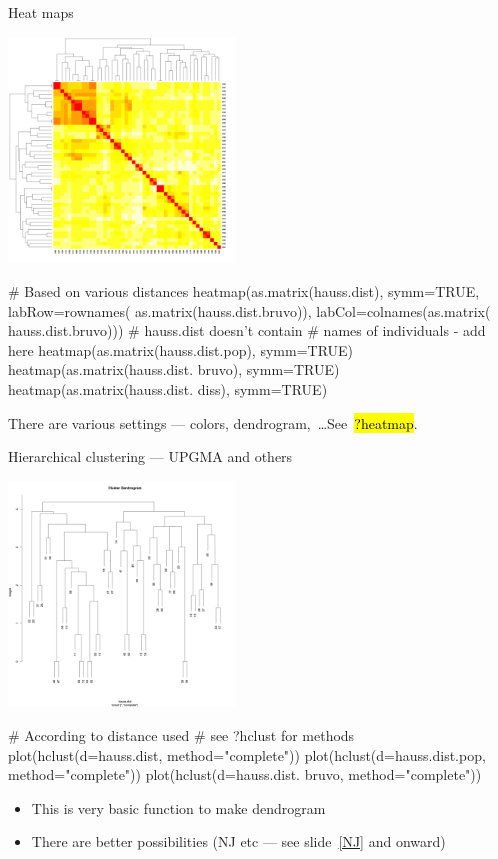 \documentclass[compress, ucs, xelatex, 11pt, xcolor=svgnames,
	hyperref={
		bookmarks=true,
		unicode=true,
		colorlinks=true,
		pdftitle={Molecular data in R},
		plainpages=false,
		pdfauthor={Vojtech Zeisek},
		pdfsubject={Course about phylogeny and evolution in R},
		pdfcreator={XeLaTeX},
		pdfkeywords={R, evolution, phylogeny, molecular data},
		linkcolor=Tomato,
		anchorcolor=SaddleBrown,
		citecolor=Goldenrod,
		filecolor=DarkMagenta,
		menucolor=Sienna,
		urlcolor=DarkTurquoise,
		pdftex},
	url={hyphens, lowtilde} %
	]{beamer}
\renewcommand{\texttt}[1]{\hl{\ttfamily #1}}
\begin{document}
\begin{frame}[fragile]{Heat maps}
	\label{hierclust}
	\begin{multicols}{2}
		\includegraphics[height=6cm]{heatmap.png}
		\columnbreak
		\begin{spluscode}
    # Based on various distances
    heatmap(as.matrix(hauss.dist),
      symm=TRUE, labRow=rownames(
      as.matrix(hauss.dist.bruvo)),
      labCol=colnames(as.matrix(
      hauss.dist.bruvo)))
      # hauss.dist doesn't contain
      # names of individuals - add here
    heatmap(as.matrix(hauss.dist.pop),
      symm=TRUE)
    heatmap(as.matrix(hauss.dist.
      bruvo), symm=TRUE)
    heatmap(as.matrix(hauss.dist.
      diss), symm=TRUE)
		\end{spluscode}
		\begin{footnotesize}
			There are various settings --- colors, dendrogram,~\ldots See~\texttt{?heatmap}.
		\end{footnotesize}
	\end{multicols}
\end{frame}

\begin{frame}[fragile]{Hierarchical clustering --- UPGMA and others}
	\begin{multicols}{2}
		\includegraphics[height=6cm]{hierclust.png}
		\begin{spluscode}
    # According to distance used
    # see ?hclust for methods
    plot(hclust(d=hauss.dist,
      method="complete"))
    plot(hclust(d=hauss.dist.pop,
      method="complete"))
    plot(hclust(d=hauss.dist.
      bruvo, method="complete"))
		\end{spluscode}
		\vfil
		\begin{itemize}
			\item This is very basic function to make dendrogram
			\item There are better possibilities (NJ etc --- see slide~\ref{NJ} and onward)
		\end{itemize}
	\end{multicols}
\end{frame}
\end{document}
